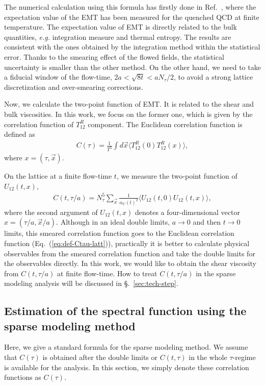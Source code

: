 \documentclass[a4paper,11pt]{article}
\newcommand\beq{ \begin{eqnarray} }
\newcommand\eeq{ \end{eqnarray} }
\begin{document}
The numerical calculation using this formula has firstly done in Ref.~\cite{Asakawa:2013laa}, where the expectation value of the EMT has been measured for the quenched QCD at finite temperature.
The expectation value of EMT is directly related to the bulk quantities, {\it e.g.} integration measure and thermal entropy.
The results are consistent with the ones obtained by the integration method within the statistical error.
Thanks to the smearing effect of the flowed fields, the statistical uncertainty is smaller than the other method.
On the other hand, we need to take a fiducial window of the flow-time, $2a < \sqrt{8t} < aN_\tau/2$, to avoid a strong lattice discretization and  over-smearing corrections.



Now, we calculate the two-point function of EMT.
It is related to the shear and bulk viscosities.
In this work, we focus on the former one, which is given by the correlation function of $T^R_{12}$ component.
The Euclidean correlation function is defined as
\beq
C(\tau) = \frac{1}{T^5} \int d \vec{x} \langle T^R_{12} (0) T^R_{12}(x) \rangle,\label{eq:def-Ctau-latt}
\eeq 
where $x=(\tau, \vec{x})$.



On the lattice at a finite flow-time $t$, we measure the two-point function of $U_{12} (t,x)$,
\beq
C (t,\tau/a)= N_\tau^5 \sum_{\vec{x}} \frac{1}{\alpha_U(t)^2} \langle U_{12} (t, 0) U_{12}(t,x) \rangle,\label{eq:def-smear-C}
\eeq
where the second argument of $U_{12} (t,x)$ denotes a four-dimensional vector $x=(\tau/a, \vec{x}/a)$.
Although in an ideal double limits, $a \rightarrow 0$ and then $t\rightarrow 0$ limits, this smeared correlation function goes to the Euclidean correlation function (Eq.~(\ref{eq:def-Ctau-latt})), practically it is better to calculate physical observables from the smeared correlation function and take the double limits for the observables directly.
In this work, we would like to obtain the shear viscosity from $C(t,\tau/a)$ at finite flow-time.
How to treat $C(t,\tau/a)$ in the sparse modeling analysis will be discussed in \S.~\ref{sec:tech-step}.



\subsection{Estimation of the spectral function using the sparse modeling method}\label{sec:sparse-Ctau}
Here, we give a standard formula for the sparse modeling method.
We assume that $C(\tau)$ is obtained after the double limits or $C(t,\tau)$ in the whole $\tau$-regime is available for the analysis.
In this section, we simply denote these correlation functions as $C(\tau)$. 
\end{document}
